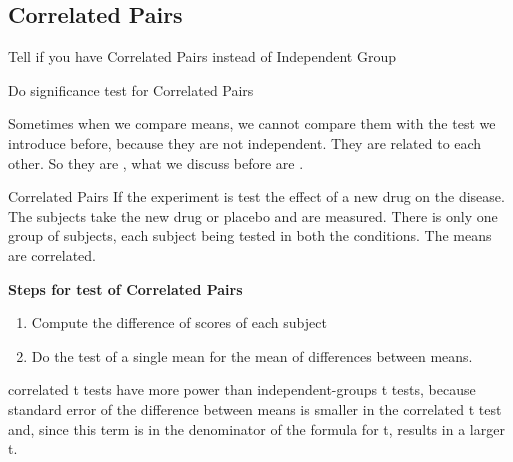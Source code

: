 \subsection{Correlated Pairs}
\begin{objectives}
    \item Tell if you have Correlated Pairs instead of Independent Group
    \item Do significance test for Correlated Pairs    
\end{objectives}
\vbox{}
Sometimes when we compare means, we cannot compare them with the test we introduce before, because they are not independent. They are related to each other. So they are , what we discuss before are .
\\
\begin{examplebox}{Correlated Pairs}
     If the experiment is test the effect of a new drug on the disease. The subjects take the new drug or placebo and are measured. There is only one group of subjects,
each subject being tested in both the conditions. The means are correlated.
\end{examplebox}
\vbox{}
\textbf{Steps for test of Correlated Pairs}
\begin{enumerate}
    \item Compute the difference of scores of each subject
    \item Do the test of a single mean for the mean of differences between means.
\end{enumerate}
correlated t tests  have more power than
independent-groups t tests, because standard error of the difference between means is smaller in the correlated t
test and, since this term is in the denominator of the formula for t, results in a
larger t.
